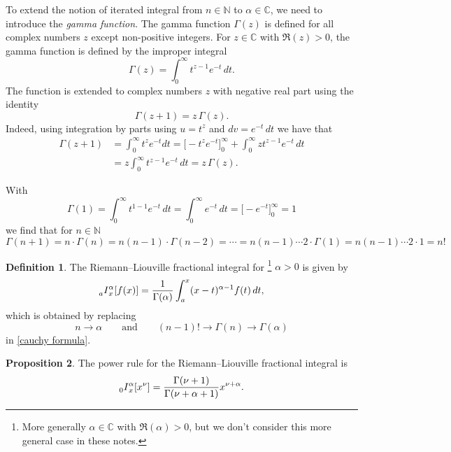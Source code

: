 \documentclass[12pt]{article}
\theoremstyle{definition}
\newtheorem{definition}{Definition}
\newtheorem{proposition}[definition]{Proposition}
\newcommand{\I}[2]{\prescript{}{#1}{I}_x^{#2}}
\begin{document}
To extend the notion of iterated integral from $n \in \mathbb{N}$ to $\alpha \in \mathbb{C}$, we need to introduce the \emph{gamma function}.   The gamma function $\Gamma(z)$ is defined for all complex numbers $z$ except non-positive integers.  For $z \in \mathbb{C}$ with $\mathfrak{R}(z)>0$, the gamma function is defined by the improper integral
\[
\Gamma(z) = \int_0^\infty t^{z-1}e^{-t}\, dt.
\]
The function is extended to complex numbers $z$ with negative real part using the identity
\[
\Gamma(z+1) = z\, \Gamma(z).
\]
Indeed, using integration by parts using $u=t^z$ and $dv = e^{-t}\, dt$ we have that 
%
\begin{align*}
\Gamma(z+1) &= \int_0^\infty t^z e^{-t} dt = \big[-t^ze^{-t}\big]_0^\infty + \int_0^\infty z t^{z-1}e^{-t}\, dt\\
&= z \int_0^\infty t^{z-1} e^{-t}\, dt = z\, \Gamma(z).
\end{align*}

With 
\[
\Gamma(1) = \int_0^\infty t^{1-1}e^{-t}\, dt = \int_0^\infty e^{-t}\,dt = \big[-e^{-t}\big]_0^\infty = 1
\]
we find that for $n \in \mathbb{N}$
\[
\Gamma(n+1) = n\cdot \Gamma(n) = n(n-1)\cdot\Gamma(n-2) = \cdots
= n(n-1)\cdots 2\cdot \Gamma(1) = n(n-1)\cdots 2\cdot 1 = n!
\]

\begin{definition}
The Riemann--Liouville fractional integral for \footnote{More generally $\alpha \in \mathbb{C}$ with $\mathfrak{R}(\alpha)>0$, but we don't consider this more general case in these notes.} $\alpha >0$ is given by
%
\begin{equation}\label{I}
\I{a}{\alpha}[f(x)] = \frac{1}{\Gamma(\alpha)}\int_a^x(x-t)^{\alpha-1} f(t)\, dt,
\end{equation}
%
which is obtained by replacing
\[
n \to \alpha \qquad \text{and}\qquad (n-1)! \to \Gamma(n) \to \Gamma(\alpha)
\]
in \eqref{cauchy formula}.
\end{definition}

\begin{proposition}
The power rule for the Riemann--Liouville fractional integral is
%
\begin{equation}\label{power rule}
\I{0}{\alpha}[x^\nu] = \frac{\Gamma(\nu+1)}{\Gamma(\nu+\alpha+1)} x^{\nu+\alpha}.
\end{equation}
\end{proposition}
\end{document}
